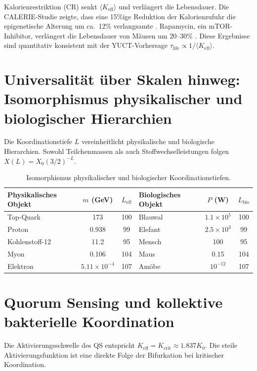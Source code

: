 \documentclass[11pt,a4paper]{article}
\begin{document}
	Kalorienrestriktion (CR) senkt \(\langle K_{\text{eff}} \rangle\) und verlängert die Lebensdauer. Die CALERIE-Studie zeigte, dass eine 15\%ige Reduktion der Kalorienzufuhr die epigenetische Alterung um ca.\ 12\% verlangsamte \cite{CALERIE2018}. Rapamycin, ein mTOR-Inhibitor, verlängert die Lebensdauer von Mäusen um 20--30\% \cite{Miller2022}. Diese Ergebnisse sind quantitativ konsistent mit der YUCT-Vorhersage \(\tau_{\text{life}} \propto 1/\langle K_{\text{eff}} \rangle\).
	
	\section{Universalität über Skalen hinweg: Isomorphismus physikalischer und biologischer Hierarchien}
	\label{sec:isomorphism}
	
	Die Koordinationstiefe \(L\) vereinheitlicht physikalische und biologische Hierarchien. Sowohl Teilchenmassen als auch Stoffwechselleistungen folgen \(X(L) = X_0 (3/2)^{-L}\).
	
	\begin{table}[H]
		\centering
		\caption{Isomorphismus physikalischer und biologischer Koordinationstiefen.}
		\label{tab:isomorphism}
		\begin{tabular}{l c c l c c}
			\toprule
			\textbf{Physikalisches Objekt} & \(m\) (GeV) & \(L_{\mathrm{eff}}\) & \textbf{Biologisches Objekt} & \(P\) (W) & \(L_{\mathrm{bio}}\) \\
			\midrule
			Top-Quark & 173 & 100 & Blauwal & \(1.1\times10^5\) & 100 \\
			Proton & 0.938 & 99 & Elefant & \(2.5\times10^3\) & 99 \\
			Kohlenstoff‑12 & 11.2 & 95 & Mensch & 100 & 95 \\
			Myon & 0.106 & 104 & Maus & 0.15 & 104 \\
			Elektron & \(5.11\times10^{-4}\) & 107 & Amöbe & \(10^{-12}\) & 107 \\
			\bottomrule
		\end{tabular}
	\end{table}
	
	\section{Quorum Sensing und kollektive bakterielle Koordination}
	
	Die Aktivierungsschwelle des QS entspricht \(K_{\text{eff}} = K_{\mathrm{crit}} \approx 1.837 K_0\). Die steile Aktivierungsfunktion ist eine direkte Folge der Bifurkation bei kritischer Koordination.
	
\end{document}
